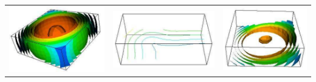 \begin{table}[t]
\begin{tabular}{c c c}
\includegraphics[width=\thumbnailwidth]{figures/Contour} & 
\includegraphics[width=\thumbnailwidth]{figures/ContourOnPlaneCut} & 
\includegraphics[width=\thumbnailwidth]{figures/ContourOnPlaneClip} \\ 

\end{tabular}
\end{table}
